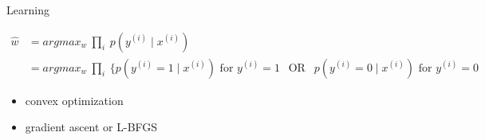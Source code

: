 \documentclass[11pt,letterpaper]{article}
\begin{document}
Learning

\begin{align*} 
  \hat{w} &= argmax_w~\prod_i~p(y^{(i)}\mid x^{(i)}) \\
          &= argmax_w~\prod_i~\{p(y^{(i)}=1 \mid x^{(i)}) \text{ for } y^{(i)}=1 ~~ \text{ OR } ~~ 
                                p(y^{(i)}=0 \mid x^{(i)}) \text{ for } y^{(i)}=0
\end{align*}

\begin{itemize}
  \item convex optimization
  \item gradient ascent or L-BFGS
\end{itemize}
\end{document}
